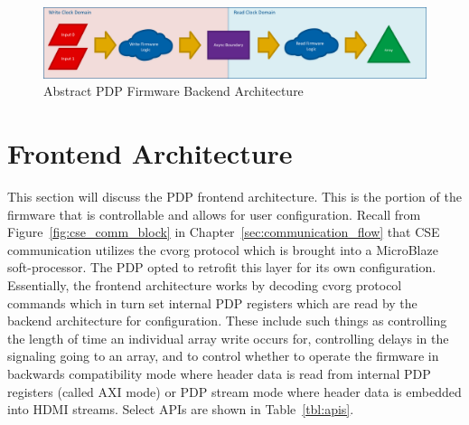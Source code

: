     \begin{figure}
        \centering
        \includegraphics[width=1.0\textwidth]{fig/abstract_architecture.pdf}
        \caption{Abstract PDP Firmware Backend Architecture}
        \label{fig:abstract_architecture}
    \end{figure}

\section{Frontend Architecture}
    \label{sec:frontend_arch}
    This section will discuss the PDP frontend architecture. This is the portion of the firmware that is controllable and allows for user configuration. Recall from Figure~\ref{fig:cse_comm_block} in Chapter~\ref{sec:communication_flow} that CSE communication utilizes the cvorg protocol which is brought into a MicroBlaze soft-processor. The PDP opted to retrofit this layer for its own configuration. Essentially, the frontend architecture works by decoding cvorg protocol commands which in turn set internal PDP registers which are read by the backend architecture for configuration. These include such things as controlling the length of time an individual array write occurs for, controlling delays in the signaling going to an array, and to control whether to operate the firmware in backwards compatibility mode where header data is read from internal PDP registers (called AXI mode) or PDP stream mode where header data is embedded into HDMI streams. Select APIs are shown in Table~\ref{tbl:apis}.

